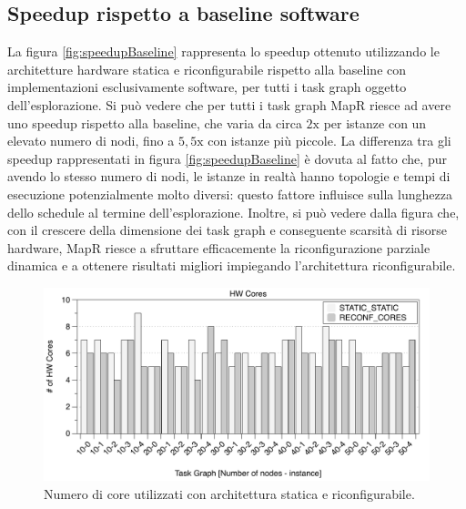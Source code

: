 \subsection{Speedup rispetto a baseline software}
La figura \ref{fig:speedupBaseline} rappresenta lo speedup ottenuto utilizzando
le architetture hardware statica e riconfigurabile rispetto alla baseline
con implementazioni esclusivamente software, per tutti i task graph oggetto
dell'esplorazione. Si pu\`o vedere che per tutti i task graph MapR riesce ad
avere uno speedup rispetto alla baseline, che varia da circa $2\text{x}$ per istanze con
un elevato numero di nodi, fino a $5,5\text{x}$ con istanze pi\`u piccole. La differenza
tra gli speedup rappresentati in figura \ref{fig:speedupBaseline} \`e dovuta al fatto che,
pur avendo lo stesso numero di nodi, le istanze in realt\`a hanno topologie e tempi di
esecuzione potenzialmente molto diversi: questo fattore influisce sulla lunghezza dello schedule
al termine dell'esplorazione.
Inoltre, si pu\`o vedere dalla figura che, con il crescere della dimensione dei task graph e
conseguente scarsit\`a di risorse hardware, MapR riesce a sfruttare efficacemente la riconfigurazione
parziale dinamica e a ottenere risultati migliori impiegando l'architettura riconfigurabile.
\begin{figure}[t]
 \begin{center}
  \includegraphics[width=\textwidth]{./capitoli/figure/cap6/FPL_HWcores.pdf}
  \caption{Numero di core utilizzati con architettura statica e riconfigurabile.}
  \label{fig:coreUtilizzati}
 \end{center}
\end{figure}

